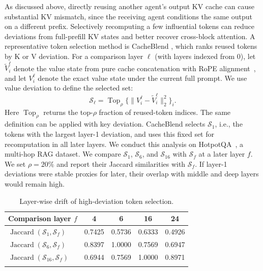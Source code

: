 \documentclass[letterpaper]{article} %
\begin{document}
As discussed above, directly reusing another agent's output KV cache can cause substantial KV mismatch, since the receiving agent conditions the same output on a different prefix. Selectively recomputing a few influential tokens can reduce deviations from full-prefill KV states and better recover cross-block attention. A representative token selection method is CacheBlend \citep{yao2025cacheblend}, which ranks reused tokens by K or V deviation. For a comparison layer $\ell$ (with layers indexed from 0), let $\tilde V_i^\ell$ denote the value state from pure cache concatenation with RoPE alignment~\citep{su2021roformer}, and let $V_i^\ell$ denote the exact value state under the current full prompt. We use value deviation to define the selected set:
\begin{equation}
\mathcal S_\ell =
\operatorname{Top}_{\rho}
\{\|V_i^\ell-\tilde V_i^\ell\|_2^2\}_i .
\end{equation}
Here $\operatorname{Top}_{\rho}$ returns the top-$\rho$ fraction of reused-token indices. The same definition can be applied with key deviation. CacheBlend selects $\mathcal S_1$, i.e., the tokens with the largest layer-1 deviation, and uses this fixed set for recomputation in all later layers. We conduct this analysis on HotpotQA~\citep{yang2018hotpotqa}, a multi-hop RAG dataset. We compare $\mathcal S_1$, $\mathcal S_6$, and $\mathcal S_{16}$ with $\mathcal S_f$ at a later layer $f$. We set $\rho=20\%$ and report their Jaccard similarities with $\mathcal S_f$. If layer-1 deviations were stable proxies for later, their overlap with middle and deep layers would remain high.

\begin{table}[t]
\centering
\setlength{\tabcolsep}{4.7pt}
\begin{tabular}{lcccc}
\hline
\addlinespace[1pt]
Comparison layer $f$ & 4 & 6 & 16 & 24 \\
\hline
\addlinespace[1pt]
$\operatorname{Jaccard}(\mathcal S_1,\mathcal S_f)$ & 0.7425 & 0.5736 & 0.6333 & 0.4926 \\
$\operatorname{Jaccard}(\mathcal S_6,\mathcal S_f)$ & 0.8397 & 1.0000 & 0.7569 & 0.6947 \\
$\operatorname{Jaccard}(\mathcal S_{16},\mathcal S_f)$ & 0.6944 & 0.7569 & 1.0000 & 0.8971 \\
\addlinespace[1pt]
\hline
\end{tabular}
\caption{Layer-wise drift of high-deviation token selection.}
\label{tab:layer-drift}
\end{table}
\end{document}
